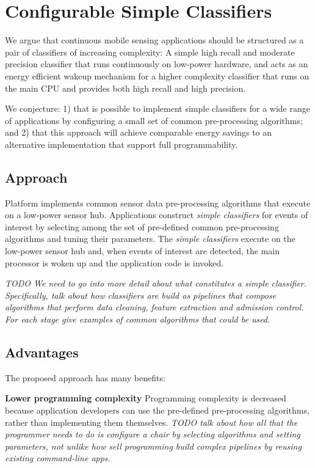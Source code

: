 \section{Configurable Simple Classifiers}
\label{sec:conjecture}

We argue that continuous mobile sensing applications should be
structured as a pair of classifiers of increasing complexity: A simple
high recall and moderate precision classifier that runs continuously
on low-power hardware, and acts as an energy efficient wakeup
mechanism for a higher complexity classifier that runs on the main CPU
and provides both high recall and high precision.

We conjecture: 1) that is possible to implement simple classifiers for a 
wide range of applications by configuring a small set of common pre-processing 
algorithms; and  2) that this approach will achieve comparable energy 
savings to an alternative implementation that support full programmability.

\subsection {Approach}

Platform implements common sensor data pre-processing algorithms that
execute on a low-power sensor hub.  Applications construct {\em
  simple classifiers} for events of interest by selecting among the
set of pre-defined common pre-processing algorithms and tuning their
parameters.  The {\em simple classifiers} execute on the
low-power sensor hub and, when events of interest are detected, the
main processor is woken up and the application code is invoked.

{\em TODO We need to go into more detail about what constitutes a {\em
    simple classifier}.  Specifically, talk about how classifiers are
  build as pipelines that compose algorithms that perform data
  cleaning, feature extraction and admission control.  For each stage
  give examples of common algorithms that could be used.}



\subsection{Advantages}

The proposed approach has many benefits:


 {\bf Lower programming complexity}  Programming complexity is
  decreased because application developers can use the pre-defined
  pre-processing algorithms, rather than implementing them themselves. {\em TODO talk about how all that the programmer needs to do is configure a chair by selecting algorithms and setting parameters, not unlike how sell programming build complex pipelines by reusing existing command-line apps.}
  

